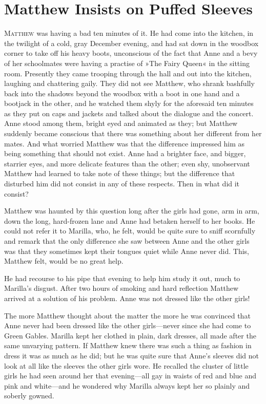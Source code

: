 \chapter{Matthew Insists on Puffed Sleeves}

\lettrine[lines=4]{M}{atthew} was having a bad ten minutes of it. He had come into the kitchen, in the twilight of a cold, gray December evening, and had sat down in the woodbox corner to take off his heavy boots, unconscious of the fact that Anne and a bevy of her schoolmates were having a practise of »The Fairy Queen« in the sitting room. Presently they came trooping through the hall and out into the kitchen, laughing and chattering gaily. They did not see Matthew, who shrank bashfully back into the shadows beyond the woodbox with a boot in one hand and a bootjack in the other, and he watched them shyly for the aforesaid ten minutes as they put on caps and jackets and talked about the dialogue and the concert. Anne stood among them, bright eyed and animated as they; but Matthew suddenly became conscious that there was something about her different from her mates. And what worried Matthew was that the difference impressed him as being something that should not exist. Anne had a brighter face, and bigger, starrier eyes, and more delicate features than the other; even shy, unobservant Matthew had learned to take note of these things; but the difference that disturbed him did not consist in any of these respects. Then in what did it consist?

Matthew was haunted by this question long after the girls had gone, arm in arm, down the long, hard-frozen lane and Anne had betaken herself to her books. He could not refer it to Marilla, who, he felt, would be quite sure to sniff scornfully and remark that the only difference she saw between Anne and the other girls was that they sometimes kept their tongues quiet while Anne never did. This, Matthew felt, would be no great help.

He had recourse to his pipe that evening to help him study it out, much to Marilla’s disgust. After two hours of smoking and hard reflection Matthew arrived at a solution of his problem. Anne was not dressed like the other girls!

The more Matthew thought about the matter the more he was convinced that Anne never had been dressed like the other girls—never since she had come to Green Gables. Marilla kept her clothed in plain, dark dresses, all made after the same unvarying pattern. If Matthew knew there was such a thing as fashion in dress it was as much as he did; but he was quite sure that Anne’s sleeves did not look at all like the sleeves the other girls wore. He recalled the cluster of little girls he had seen around her that evening—all gay in waists of red and blue and pink and white—and he wondered why Marilla always kept her so plainly and soberly gowned.

